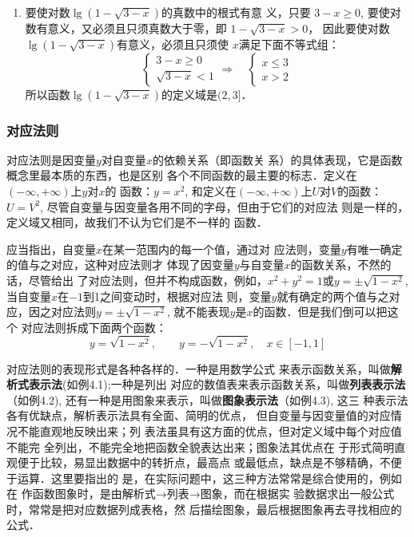 \begin{solution}
\begin{enumerate}
\item 要使对数$\lg(1-\sqrt{3-x})$的真数中的根式有意
义，只要
$3-x\ge 0$, 
要使对数有意义，又必须且只须真数大于零，即
$1-\sqrt{3-x}>0$，
因此要使对数$\lg(1-\sqrt{3-x})$有意义，必须且只须使
$x$满足下面不等式组：
\[\begin{cases}
    3-x\ge 0\\
\sqrt{3-x}<1
\end{cases}\Rightarrow\quad \begin{cases}
    x\le 3\\
x>2
\end{cases}\]
所以函数$\lg(1-\sqrt{3-x})$的定义域是$(2,3]$． 

\end{enumerate}    
\end{solution}

\subsubsection{对应法则}
对应法则是因变量$y$对自变量$x$的依赖关系（即函数关
系）的具体表现，它是函数概念里最本质的东西，也是区别
各个不同函数的最主要的标志．定义在$(-\infty,+\infty)$上$y$对$x$的
函数：$y=x^2$, 和定义在$(-\infty,+\infty)$上$U$对$V$的函数：$U=V^2$, 
尽管自变量与因变量各用不同的字母，但由于它们的对应法
则是一样的，定义域又相同，故我们不认为它们是不一样的
函数．

应当指出，自变量$x$在某一范围内的每一个值，通过对
应法则，变量$y$有唯一确定的值与之对应，这种对应法则才
体现了因变量$y$与自变量$x$的函数关系，不然的话，尽管给出
了对应法则，但并不构成函数，例如，$x^2+y^2=1$或$y=
\pm\sqrt{1-x^2}$, 当自变量$x$在$-1$到1之间变动时，根据对应法
则，变量$y$就有确定的两个值与之对应，因之对应法则$y=
\pm\sqrt{1-x^2}$, 就不能表现$y$是$x$的函数．但是我们倒可以把这个
对应法则拆成下面两个函数：
\[y=\sqrt{1-x^2},\qquad y=-\sqrt{1-x^2},\quad x\in [-1,1]\]

对应法则的表现形式是各种各样的．一种是用数学公式
来表示函数关系，叫做\textbf{解析式表示法}(如例4.1);一种是列出
对应的数值表来表示函数关系，叫做\textbf{列表表示法}（如例4.2),
还有一种是用图象来表示，叫做\textbf{图象表示法}（如例4.3), 这三
种表示法各有优缺点，解析表示法具有全面、简明的优点，
但自变量与因变量值的对应情况不能直观地反映出来；列
表法虽具有这方面的优点，但对定义域中每个对应值不能完
全列出，不能完全地把函数全貌表达出来；图象法其优点在
于形式简明直观便于比较，易显出数据中的转折点，最高点
或最低点，缺点是不够精确，不便于运算．这里要指出的
是，在实际问题中，这三种方法常常是综合使用的，例如在
作函数图象时，是由解析式→列表→图象，而在根据实
验数据求出一般公式时，常常是把对应数据列成表格，然
后描绘图象，最后根据图象再去寻找相应的公式．

